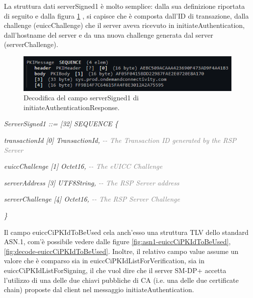 \documentclass[10pt, oneside]{book}
\begin{document}
La struttura dati serverSigned1 è molto semplice: dalla sua definizione riportata di seguito e dalla figura \ref{fig:decode-serverSigned1} \cite{RSP-definitions}, si capisce che è composta dall'ID di transazione, dalla challenge (euiccChallenge) che il server aveva ricevuto in initiateAuthentication, dall'hostname del server e da una nuova challenge generata dal server (serverChallenge).\\
\begin{figure}
\includegraphics[width=\linewidth]{decode-serverSigned1.png}
\caption{Decodifica del campo serverSigned1 di initiateAuthenticationResponse.}
\label{fig:decode-serverSigned1}
\end{figure}

\textit{ServerSigned1 ::= [32] SEQUENCE \{}

\hspace{0.75cm} \textit{transactionId [0] TransactionId, \textcolor{gray}{{-}{-} The Transaction ID generated by the RSP Server}}

\hspace{0.75cm} \textit{euiccChallenge [1] Octet16, \textcolor{gray}{{-}{-} The eUICC Challenge}}

\hspace{0.75cm} \textit{serverAddress [3] UTF8String, \textcolor{gray}{{-}{-} The RSP Server address}}

\hspace{0.75cm} \textit{serverChallenge [4] Octet16, \textcolor{gray}{{-}{-} The RSP Server Challenge}}

\textit{\}\\}

Il campo euiccCiPKIdToBeUsed cela anch'esso una struttura TLV dello standard ASN.1, com'è possibile vedere dalle figure \ref{fig:asn1-euiccCiPKIdToBeUsed}, \ref{fig:decode-euiccCiPKIdToBeUsed}. Inoltre, il relativo campo value assume un valore che è comparso sia in euiccCiPKIdListForVerification, sia in euiccCiPKIdListForSigning, il che vuol dire che il server SM-DP+ accetta l'utilizzo di una delle due chiavi pubbliche di CA (i.e. una delle due certificate chain) proposte dal client nel messaggio initiateAuthentication.\\
\end{document}
